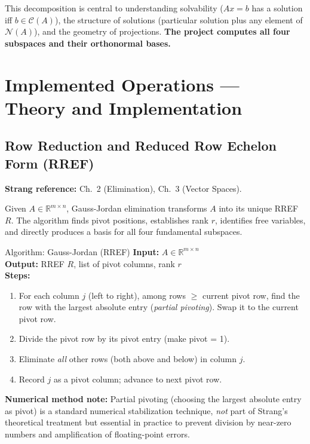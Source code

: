 \documentclass[12pt, a4paper]{article}
\newcommand{\R}{\mathbb{R}}
\newcommand{\Null}{\mathcal{N}}
\newcommand{\Col}{\mathcal{C}}
\begin{document}
This decomposition is central to understanding solvability ($Ax=b$ has a
solution iff $b \in \Col(A)$), the structure of solutions (particular solution
plus any element of $\Null(A)$), and the geometry of projections.
\textbf{The project computes all four subspaces and their orthonormal bases.}

\section{Implemented Operations — Theory and Implementation}

\subsection{Row Reduction and Reduced Row Echelon Form (RREF)}

\textbf{Strang reference:} Ch.\ 2 (Elimination), Ch.\ 3 (Vector Spaces).

Given $A \in \R^{m \times n}$, Gauss-Jordan elimination transforms $A$ into
its unique RREF $R$.  The algorithm finds pivot positions, establishes rank
$r$, identifies free variables, and directly produces a basis for all four
fundamental subspaces.

\begin{algobox}{Algorithm: Gauss-Jordan (RREF)}
\textbf{Input:} $A \in \R^{m\times n}$\\
\textbf{Output:} RREF $R$, list of pivot columns, rank $r$\\
\textbf{Steps:}
\begin{enumerate}[leftmargin=*, noitemsep]
  \item For each column $j$ (left to right), among rows $\geq$ current pivot row,
        find the row with the largest absolute entry (\emph{partial pivoting}).
        Swap it to the current pivot row.
  \item Divide the pivot row by its pivot entry (make pivot = 1).
  \item Eliminate \emph{all} other rows (both above and below) in column $j$.
  \item Record $j$ as a pivot column; advance to next pivot row.
\end{enumerate}
\end{algobox}

\noindent
\textbf{Numerical method note:} Partial pivoting (choosing the largest
absolute entry as pivot) is a standard numerical stabilization technique,
\emph{not} part of Strang's theoretical treatment but essential in practice
to prevent division by near-zero numbers and amplification of floating-point
errors.
\end{document}
